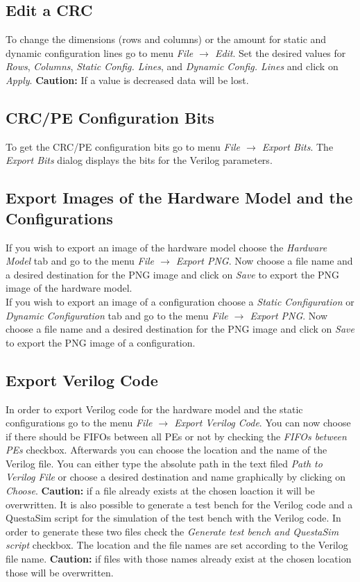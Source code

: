 \documentclass{article}
\begin{document}
\subsection*{Edit a CRC}
To change the dimensions (rows and columns) or the amount for static and dynamic configuration lines go to menu \textit{File $\rightarrow$ Edit}. Set the desired values for \textit{Rows}, \textit{Columns}, \textit{Static Config. Lines}, and \textit{Dynamic Config. Lines} and click on \textit{Apply}. \textbf{Caution:} If a value is decreased data will be lost.

\subsection*{CRC/PE Configuration Bits}
To get the CRC/PE configuration bits go to menu \textit{File $\rightarrow$ Export Bits}. The \textit{Export Bits} dialog displays the bits for the Verilog parameters.

\subsection*{Export Images of the Hardware Model and the Configurations}
If you wish to export an image of the hardware model choose the \textit{Hardware Model} tab and go to the menu \textit{File $\rightarrow$ Export PNG}. Now choose a file name and a desired destination for the PNG image and click on \textit{Save} to export the PNG image of the hardware model.\\
If you wish to export an image of a configuration choose a \textit{Static Configuration} or \textit{Dynamic Configuration} tab and go to the menu \textit{File $\rightarrow$ Export PNG}. Now choose a file name and a desired destination for the PNG image and click on \textit{Save} to export the PNG image of a configuration. 

\subsection*{Export Verilog Code}
In order to export Verilog code for the hardware model and the static configurations go to the menu \textit{File $\rightarrow$ Export Verilog Code}. You can now choose if there should be FIFOs between all PEs or not by checking the \textit{FIFOs between PEs} checkbox. Afterwards you can choose the location and the name of the Verilog file. You can either type the absolute path in the text filed \textit{Path to Verilog File} or choose a desired destination and name graphically by clicking on \textit{Choose}. \textbf{Caution:} if a file already exists at the chosen loaction it will be overwritten. It is also possible to generate a test bench for the Verilog code and a QuestaSim script for the simulation of the test bench with the Verilog code. In order to generate these two files check the \textit{Generate test bench and QuestaSim script} checkbox. The location and the file names are set according to the Verilog file name. \textbf{Caution:} if files with those names already exist at the chosen location those will be overwritten.\\
\end{document}
